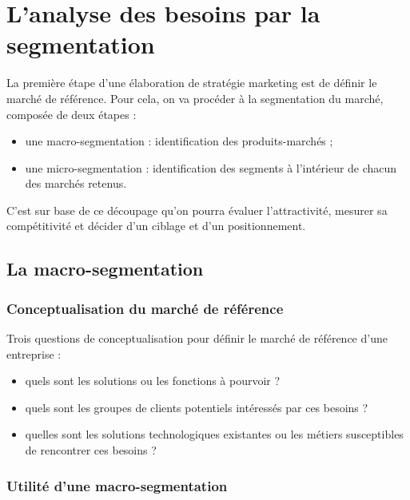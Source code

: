 
\chapter{L'analyse des besoins par la segmentation}

	La première étape d'une élaboration de stratégie marketing est de définir le marché de référence. Pour cela, on va procéder à la segmentation du marché, composée de deux étapes :
	
	\begin{itemize}
		\item une macro-segmentation : identification des produits-marchés ;
		\item une micro-segmentation : identification des segments à l'intérieur de chacun des marchés retenus.
	\end{itemize}
		
	C'est sur base de ce découpage qu'on pourra évaluer l'attractivité, mesurer sa compétitivité et décider d'un ciblage et d'un positionnement.
	
	\section{La macro-segmentation}
	
		\subsection{Conceptualisation du marché de référence}
		
		Trois questions de conceptualisation pour définir le marché de référence d'une entreprise :
	
		\begin{itemize}
			\item quels sont les solutions ou les fonctions à pourvoir ?
			\item quels sont les groupes de clients potentiels intéressés par ces besoins ?
			\item quelles sont les solutions technologiques existantes ou les métiers susceptibles de rencontrer ces besoins ?
		\end{itemize}
	
	
	
	
	
		\subsection{Utilité d'une macro-segmentation}
		
